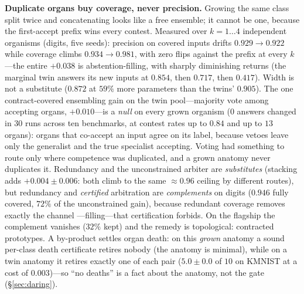\documentclass{article}
\begin{document}
\textbf{Duplicate organs buy coverage, never precision.} Growing the same
class split twice and concatenating looks like a free ensemble; it cannot be
one, because the first-accept prefix wins every contest. Measured over
$k=1\ldots4$ independent organisms (digits, five seeds): precision on covered
inputs drifts $0.929 \to 0.922$ while coverage climbs $0.934 \to 0.981$, with
zero flips against the prefix at every $k$---the entire $+0.038$ is
abstention-filling, with sharply diminishing returns (the marginal twin
answers its new inputs at $0.854$, then $0.717$, then $0.417$). Width is not a
substitute ($0.872$ at $59\%$ more parameters than the twins' $0.905$). The one
contract-covered ensembling gain on the twin pool---majority vote among
accepting organs, $+0.010$---is a \emph{null} on every grown organism ($0$
answers changed in $30$ runs across ten benchmarks, at contest rates up to
$0.84$ and up to $13$ organs): organs that co-accept an input agree on its
label, because vetoes leave only the generalist and the true specialist
accepting. Voting had something to route only where competence was
duplicated, and a grown anatomy never duplicates it.
Redundancy and the unconstrained arbiter are \emph{substitutes} (stacking adds
$+0.004 \pm 0.006$: both climb to the same ${\approx}0.96$ ceiling by
different routes), but redundancy and \emph{certified} arbitration are
\emph{complements} on digits ($0.946$ fully covered, $72\%$ of the
unconstrained gain), because redundant coverage removes exactly the channel
---filling---that certification forbids. On the flagship the complement
vanishes ($32\%$ kept) and the remedy is topological: contracted prototypes.
A by-product settles organ death: on this \emph{grown} anatomy a sound
per-class death certificate retires nobody (the anatomy is minimal), while on
a twin anatomy it retires exactly one of each pair ($5.0 \pm 0.0$ of $10$ on
KMNIST at a cost of $0.003$)---so ``no deaths'' is a fact about the anatomy,
not the gate (\S\ref{sec:daring}).
\end{document}
